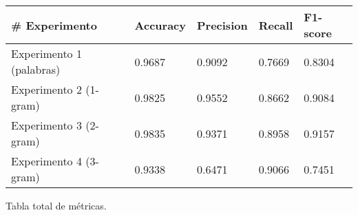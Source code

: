 
\begin{tabular}{|l|llll|}
\hline
\# Experimento & Accuracy &     Precision &     Recall  &   F1-score \\ \hline
Experimento 1 (palabras) &       0.9687  &       0.9092  &       0.7669  &       0.8304  \\ \hline
Experimento 2 (1-gram) &       0.9825  &       {\color{OliveGreen} 0.9552}  &       0.8662  &       0.9084  \\ \hline
Experimento 3 (2-gram) &       {\color{OliveGreen} 0.9835}  &       0.9371  &       0.8958  &       {\color{OliveGreen} 0.9157}  \\ \hline
Experimento 4 (3-gram) &       0.9338  &       0.6471  &      {\color{OliveGreen}  0.9066}  &       0.7451  \\ \hline
\end{tabular}
\caption{Tabla total de métricas.}
